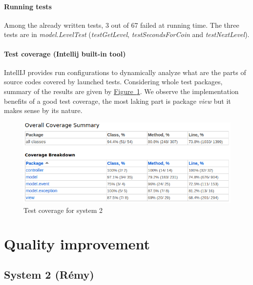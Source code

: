 \documentclass[]{article}
\newcommand{\wordlink}[2]{\hyperref[#2]{#1~\ref{#2}}}
\begin{document}
\paragraph{Running tests}

Among the already written tests, 3 out of 67 failed at running time. The three tests are in \textit{model.LevelTest} (\textit{testGetLevel}, \textit{testSecondsForCoin} and \textit{testNextLevel}). 

\paragraph{Test coverage (Intellij built-in tool)}

IntellIJ provides run configurations to dynamically analyze what are the parts of source codes covered by launched tests. Considering whole test packages, summary of the results are given by \wordlink{Figure}{fig:S2_test_coverage}. We observe the implementation benefits of a good test coverage, the most laking part is package \textit{view} but it makes sense by its nature.

\newpage

\begin{figure}[h]
\centering
\includegraphics[width=0.75\linewidth]{S2-test_coverage}
\caption{Test coverage for system 2}
\label{fig:S2_test_coverage}
\end{figure}

\newpage
\section{Quality improvement}

\subsection{System 2 (Rémy)}
\end{document}
